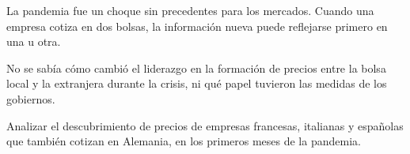 \documentclass{article}
\newcommand{\bodysize}{\fontsize{30}{39.6}\selectfont}
\newcommand{\cardtitlesize}{\fontsize{35.4}{42.5}\selectfont}
\newcommand{\smallsize}{\fontsize{24.6}{32.0}\selectfont}
\newcommand{\cardtitle}[2][navy]{{\color{#1}\cardtitlesize\bfseries\textls[110]{\MakeUppercase{#2}}}\par\vspace{7mm}}
\begin{document}
\vfill
\hspace*{34mm}\begin{minipage}{773mm}
\begin{tcolorbox}[enhanced, sharp corners, colback=navy, boxrule=0pt, left=16mm, right=16mm, top=12mm, bottom=11mm,
  fontupper=\bodysize\raggedright, overlay={\fill[gold] (frame.north west) rectangle ([yshift=-5mm]frame.north east);}]
\begin{minipage}[t]{174.8mm}\raggedright{\color{acento}\smallsize\bfseries{}}\par{}\end{minipage}\hfill\begin{minipage}[t]{174.8mm}\raggedright{\color{acento}\smallsize\bfseries{}}\par{}\end{minipage}\hfill\begin{minipage}[t]{174.8mm}\raggedright{\color{acento}\smallsize\bfseries{}}\par{}\end{minipage}\hfill\begin{minipage}[t]{174.8mm}\raggedright{\color{acento}\smallsize\bfseries{}}\par{}\end{minipage}
\end{tcolorbox}
\end{minipage}

\vfill
\hspace*{34mm}\begin{minipage}{773mm}
\begin{tcbraster}[raster columns=3, raster equal height, raster column skip=16mm]
\begin{tcolorbox}[card]\cardtitle{Contexto}La pandemia fue un choque sin precedentes para los mercados. Cuando una empresa cotiza en dos bolsas, la información nueva puede reflejarse primero en una u otra.\end{tcolorbox}
\begin{tcolorbox}[card]\cardtitle{Problema}No se sabía cómo cambió el liderazgo en la formación de precios entre la bolsa local y la extranjera durante la crisis, ni qué papel tuvieron las medidas de los gobiernos.\end{tcolorbox}
\begin{tcolorbox}[card]\cardtitle{Objetivo}Analizar el descubrimiento de precios de empresas francesas, italianas y españolas que también cotizan en Alemania, en los primeros meses de la pandemia.\end{tcolorbox}
\end{tcbraster}
\end{minipage}
\end{document}
